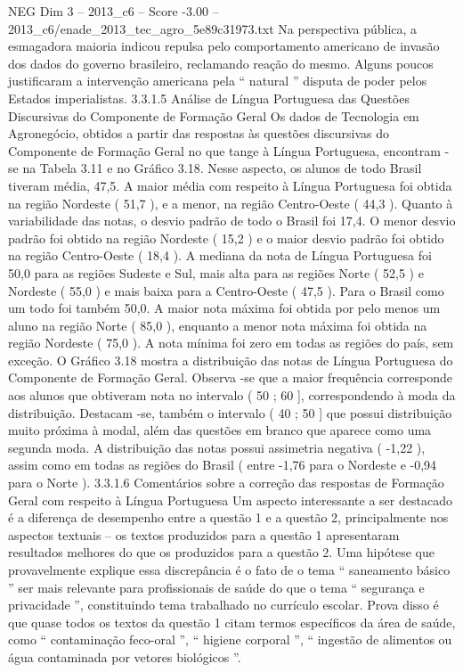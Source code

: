 \begin{textsample}{NEG Dim 3 – 2013\_c6 – Score -3.00 – 2013\_c6/enade\_2013\_tec\_agro\_5e89c31973.txt}
Na perspectiva pública, a esmagadora maioria indicou repulsa pelo comportamento americano de invasão dos dados do governo brasileiro, reclamando reação do mesmo.
Alguns poucos justificaram a intervenção americana pela “ natural ” disputa de poder pelos Estados imperialistas. 3.3.1.5 Análise de Língua Portuguesa das Questões Discursivas do Componente de Formação Geral Os dados de Tecnologia em Agronegócio, obtidos a partir das respostas às questões discursivas do Componente de Formação Geral no que tange à Língua Portuguesa, encontram -se na Tabela 3.11 e no Gráfico 3.18.
Nesse aspecto, os alunos de todo Brasil tiveram média, 47,5.
A maior média com respeito à Língua Portuguesa foi obtida na região Nordeste ( 51,7 ), e a menor, na região Centro-Oeste ( 44,3 ).
Quanto à variabilidade das notas, o desvio padrão de todo o Brasil foi 17,4.
O menor desvio padrão foi obtido na região Nordeste ( 15,2 ) e o maior desvio padrão foi obtido na região Centro-Oeste ( 18,4 ).
A mediana da nota de Língua Portuguesa foi 50,0 para as regiões Sudeste e Sul, mais alta para as regiões Norte ( 52,5 ) e Nordeste ( 55,0 ) e mais baixa para a Centro-Oeste ( 47,5 ).
Para o Brasil como um todo foi também 50,0.
A maior nota máxima foi obtida por pelo menos um aluno na região Norte ( 85,0 ), enquanto a menor nota máxima foi obtida na região Nordeste ( 75,0 ).
A nota mínima foi zero em todas as regiões do país, sem exceção.
O Gráfico 3.18 mostra a distribuição das notas de Língua Portuguesa do Componente de Formação Geral.
Observa -se que a maior frequência corresponde aos alunos que obtiveram nota no intervalo ( 50 ; 60 ], correspondendo à moda da distribuição.
Destacam -se, também o intervalo ( 40 ; 50 ] que possui distribuição muito próxima à modal, além das questões em branco que aparece como uma segunda moda.
A distribuição das notas possui assimetria negativa ( -1,22 ), assim como em todas as regiões do Brasil ( entre -1,76 para o Nordeste e -0,94 para o Norte ). 3.3.1.6 Comentários sobre a correção das respostas de Formação Geral com respeito à Língua Portuguesa Um aspecto interessante a ser destacado é a diferença de desempenho entre a questão 1 e a questão 2, principalmente nos aspectos textuais – os textos produzidos para a questão 1 apresentaram resultados melhores do que os produzidos para a questão 2.
Uma hipótese que provavelmente explique essa discrepância é o fato de o tema “ saneamento básico ” ser mais relevante para profissionais de saúde do que o tema “ segurança e privacidade ”, constituindo tema trabalhado no currículo escolar.
Prova disso é que quase todos os textos da questão 1 citam termos específicos da área de saúde, como “ contaminação feco-oral ”, “ higiene corporal ”, “ ingestão de alimentos ou água contaminada por vetores biológicos ”.

\end{textsample}
